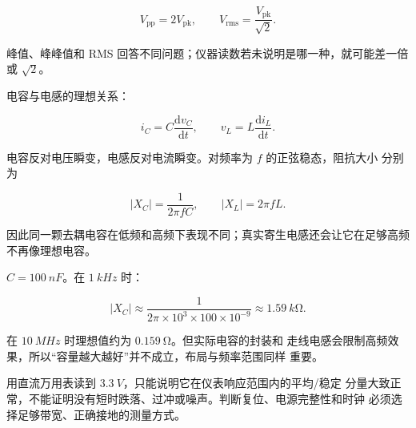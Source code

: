 \[
V_{\mathrm{pp}}=2V_{\mathrm{pk}},
\qquad
V_{\mathrm{rms}}=\frac{V_{\mathrm{pk}}}{\sqrt{2}}.
\]

峰值、峰峰值和 RMS 回答不同问题；仪器读数若未说明是哪一种，就可能差一倍或
\(\sqrt{2}\)。

电容与电感的理想关系：

\[
i_C=C\frac{\mathrm{d}v_C}{\mathrm{d}t},
\qquad
v_L=L\frac{\mathrm{d}i_L}{\mathrm{d}t}.
\]

电容反对电压瞬变，电感反对电流瞬变。对频率为 \(f\) 的正弦稳态，阻抗大小
分别为

\[
|X_C|=\frac{1}{2\pi f C},
\qquad
|X_L|=2\pi f L.
\]

因此同一颗去耦电容在低频和高频下表现不同；真实寄生电感还会让它在足够高频
不再像理想电容。

\begin{workedexample}
\(C=\SI{100}{nF}\)。在 \(\SI{1}{kHz}\) 时：

\[
|X_C|\approx\frac{1}{2\pi\times10^3\times100\times10^{-9}}
\approx\SI{1.59}{k\ohm}.
\]

在 \(\SI{10}{MHz}\) 时理想值约为 \(\SI{0.159}{\ohm}\)。但实际电容的封装和
走线电感会限制高频效果，所以“容量越大越好”并不成立，布局与频率范围同样
重要。
\end{workedexample}

\begin{failurebox}
用直流万用表读到 \(\SI{3.3}{V}\)，只能说明它在仪表响应范围内的平均/稳定
分量大致正常，不能证明没有短时跌落、过冲或噪声。判断复位、电源完整性和时钟
必须选择足够带宽、正确接地的测量方式。
\end{failurebox}
